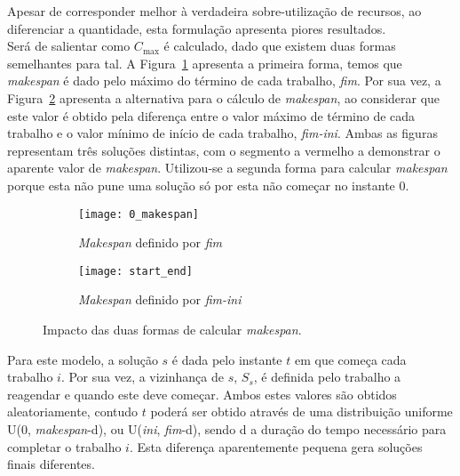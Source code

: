 Apesar de corresponder melhor à verdadeira sobre-utilização de recursos, ao diferenciar a quantidade, esta formulação apresenta piores resultados.\\

Será de salientar como $C_{\max}$ é calculado, dado que existem duas formas semelhantes para tal. A Figura~\ref{fig:0_makespan} apresenta a primeira forma, temos que \textit{makespan} é dado pelo máximo do término de cada trabalho, \textit{fim}. Por sua vez, a Figura~\ref{fig:start_end} apresenta a alternativa para o cálculo de \textit{makespan}, ao considerar que este valor é obtido pela diferença entre o valor máximo de término de cada trabalho e o valor mínimo de início de cada trabalho, \textit{fim-ini}. Ambas as figuras representam três soluções distintas, com o segmento a vermelho a demonstrar o aparente valor de \textit{makespan}. Utilizou-se a segunda forma para calcular \textit{makespan} porque esta não pune uma solução só por esta não começar no instante 0.\\
\begin{figure}[H]
	\centering
	\begin{subfigure}{0.49\textwidth}
	\centering
		\texttt{[image: 0\_makespan]}
		\caption{\textit{Makespan} definido por \textit{fim}}
		\label{fig:0_makespan}
	\end{subfigure}
	\begin{subfigure}{0.49\textwidth}
	\centering
		\texttt{[image: start\_end]}
		\caption{\textit{Makespan} definido por \textit{fim-ini}}
		\label{fig:start_end}
	\end{subfigure}
	\caption{Impacto das duas formas de calcular \textit{makespan}.}
	\label{fig:dif_makespan}
\end{figure}

Para este modelo, a solução $s$ é dada pelo instante $t$ em que começa cada trabalho $i$. Por sua vez, a vizinhança de $s$, $S_{s}$, é definida pelo trabalho a reagendar e quando este deve começar. Ambos estes valores são obtidos aleatoriamente, contudo $t$ poderá ser obtido através de uma distribuição uniforme U(0, \textit{makespan}-d), ou U(\textit{ini}, \textit{fim}-d), sendo d a duração do tempo necessário para completar o trabalho $i$. Esta diferença aparentemente pequena gera soluções finais diferentes.\\


